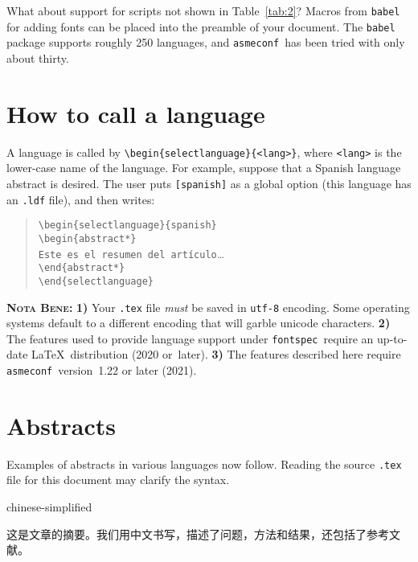 \documentclass[colorlinks,nofoot,spanish,japanese,russian,greek,ukrainian,vietnamese,french,portuguese,turkish,polish,indonesian,italian,german,latin,serbianc,bidi=basic]{asmeconf}
\newcommand*\FS{{\upshape\texttt{fontspec}}}
\newcommand*\AC{{\upshape\texttt{asmeconf}}}
\begin{document}
What about support for scripts not shown in Table~\ref{tab:2}?  Macros from \texttt{babel} for adding fonts can be placed into the preamble of your document.  The \texttt{babel} package supports roughly 250 languages, and \AC\ has been tried with only about thirty. 

\section{How to call a language\label{sec:6}}
A language is called by \verb|\begin{selectlanguage}{<lang>}|, where \texttt{<lang>} is the lower-case name of the language.  
For example, suppose that a Spanish language abstract is desired. The user puts \texttt{[spanish]} as a global option (this language has an \texttt{.ldf} file), and then writes:
\begin{quotation}
\noindent\hbox{}\verb|\begin{selectlanguage}{spanish}|\\
\verb|\begin{abstract*}|\\
\verb|Este es el resumen del artículo|\ldots\\ 
\verb|\end{abstract*}|\\
\verb|\end{selectlanguage}|
\end{quotation}

\textsc{\textbf{Nota Bene:}} \textbf{1)} Your \texttt{.tex} file \textit{must} be saved in \texttt{utf-8} encoding.  Some operating systems default to a different encoding that will garble unicode characters. \textbf{2)} The features used to provide language support under \FS\ require an up-to-date \LaTeX\ distribution (2020 or~later). \textbf{3)} The features described here require \AC\  version~1.22 or later (2021).

\section{Abstracts}
Examples of abstracts in various languages now follow. Reading the source \texttt{.tex} file for this document may clarify the syntax.

\begin{selectlanguage}{chinese-simplified}
\begin{abstract*}
这是文章的摘要。我们用中文书写，描述了问题，方法和结果，还包括了参考文献。
\end{abstract*}
\end{selectlanguage}%
\end{document}
